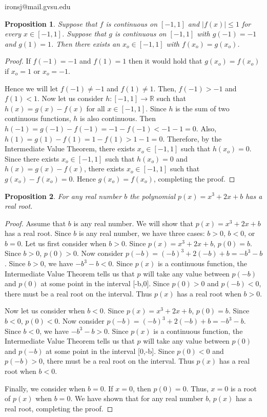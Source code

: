 \documentclass[11 pt]{article}
\newtheorem{proposition}{Proposition}
\newcommand{\newpar}{\vspace{.15in}\noindent}
\begin{document}
\noindent ironsj@mail.gvsu.edu
\newpar
\begin{proposition}
Suppose that $f$ is continuous on $[-1, 1]$ and $\mid f(x)\mid\le1$ for every $x\in[-1, 1]$. Suppose
that $g$ is continuous on $[-1, 1]$ with $g(-1)=-1$ and $g(1)=1$. Then there exists an $x_o\in[-1, 1]$ with $f(x_o)=g(x_o)$.
\end{proposition}
\begin{proof}
If $f(-1)=-1$ and $f(1)=1$ then it would hold that $g(x_o)=f(x_o)$ if $x_o=1$ or $x_o=-1$.

\newpar
Hence we will let $f(-1)\neq-1$ and $f(1)\neq1$. Then, $f(-1)>-1$ and $f(1)<1$. Now let us consider $h:[-1,1]\rightarrow\mathbb{R}$ such that $h(x)=g(x)-f(x)$ for all $x\in[-1,1]$. Since $h$ is the sum of two continuous functions, $h$ is also continuous. Then $h(-1)=g(-1)-f(-1)=-1-f(-1)<-1-1=0$. Also, $h(1)=g(1)-f(1)=1-f(1)>1-1=0$. Therefore, by the Intermediate Value Theorem, there exists $x_o\in[-1,1]$ such that $h(x_o)=0$. Since there exists $x_o\in[-1,1]$ such that $h(x_o)=0$ and $h(x)=g(x)-f(x)$, there exists $x_o\in[-1,1]$ such that $g(x_o)-f(x_o)=0$. Hence $g(x_o)=f(x_o)$, completing the proof.


\end{proof}

\newpar
\begin{proposition}
For any real number $b$ the polynomial $p(x)=x^3+2x+b$ has a real root.

\end{proposition}
\begin{proof}
Assume that $b$ is any real number. We will show that $p(x)=x^3+2x+b$ has a real root. Since $b$ is any real number, we have three cases: $b>0$, $b<0$, or $b=0$.
Let us first consider when $b>0$. Since $p(x)=x^3+2x+b$, $p(0)=b$. Since $b>0$, $p(0)>0$. Now consider $p(-b)=(-b)^3+2(-b)+b=-b^3-b$. Since $b>0$, we have $-b^3-b<0$. Since $p(x)$ is a continuous function, the Intermediate Value Theorem tells us that $p$ will take any value between $p(-b)$ and $p(0)$ at some point in the interval [-b,0]. Since $p(0)>0$ and $p(-b)<0$, there must be a real root on the interval. Thus $p(x)$ has a real root when $b>0$.

\newpar
Now let us consider when $b<0$. Since $p(x)=x^3+2x+b$, $p(0)=b$. Since $b<0$, $p(0)<0$. Now consider $p(-b)=(-b)^3+2(-b)+b=-b^3-b$. Since $b<0$, we have $-b^3-b>0$. Since $p(x)$ is a continuous function, the Intermediate Value Theorem tells us that $p$ will take any value between $p(0)$ and $p(-b)$ at some point in the interval [0,-b]. Since $p(0)<0$ and $p(-b)>0$, there must be a real root on the interval. Thus $p(x)$ has a real root when $b<0$.

\newpar
Finally, we consider when $b=0$. If $x=0$, then $p(0)=0$. Thus, $x=0$ is a root of $p(x)$ when $b=0$. We have shown that for any real number $b$, $p(x)$ has a real root, completing the proof.


\end{proof}
\end{document}
